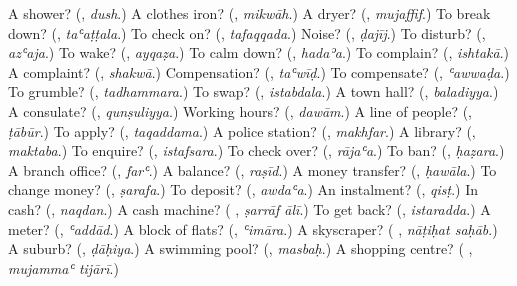 \begin{tcolorbox}[breakable,colback=teal!4,colframe=teal!35!black,title={Before you move on}]
A shower? (\textbf{}, \emph{dush}.) A clothes iron? (\textbf{}, \emph{mikwāh}.) A dryer? (\textbf{}, \emph{mujaffif}.) To break down? (\textbf{}, \emph{taʿaṭṭala}.) To check on? (\textbf{}, \emph{tafaqqada}.) Noise? (\textbf{}, \emph{ḍajīj}.) To disturb? (\textbf{}, \emph{azʿaja}.) To wake? (\textbf{}, \emph{ayqaẓa}.) To calm down? (\textbf{}, \emph{hadaʾa}.) To complain? (\textbf{}, \emph{ishtakā}.) A complaint? (\textbf{}, \emph{shakwā}.) Compensation? (\textbf{}, \emph{taʿwīḍ}.) To compensate? (\textbf{}, \emph{ʿawwaḍa}.) To grumble? (\textbf{}, \emph{tadhammara}.) To swap? (\textbf{}, \emph{istabdala}.) A town hall? (\textbf{}, \emph{baladiyya}.) A consulate? (\textbf{}, \emph{qunṣuliyya}.) Working hours? (\textbf{}, \emph{dawām}.) A line of people? (\textbf{}, \emph{ṭābūr}.) To apply? (\textbf{}, \emph{taqaddama}.) A police station? (\textbf{}, \emph{makhfar}.) A library? (\textbf{}, \emph{maktaba}.) To enquire? (\textbf{}, \emph{istafsara}.) To check over? (\textbf{}, \emph{rājaʿa}.) To ban? (\textbf{}, \emph{ḥaẓara}.) A branch office? (\textbf{}, \emph{farʿ}.) A balance? (\textbf{}, \emph{raṣīd}.) A money transfer? (\textbf{}, \emph{ḥawāla}.) To change money? (\textbf{}, \emph{ṣarafa}.) To deposit? (\textbf{}, \emph{awdaʿa}.) An instalment? (\textbf{}, \emph{qisṭ}.) In cash? (\textbf{}, \emph{naqdan}.) A cash machine? (\textbf{ }, \emph{ṣarrāf ālī}.) To get back? (\textbf{}, \emph{istaradda}.) A meter? (\textbf{}, \emph{ʿaddād}.) A block of flats? (\textbf{}, \emph{ʿimāra}.) A skyscraper? (\textbf{ }, \emph{nāṭiḥat saḥāb}.) A suburb? (\textbf{}, \emph{ḍāḥiya}.) A swimming pool? (\textbf{}, \emph{masbaḥ}.) A shopping centre? (\textbf{ }, \emph{mujammaʿ tijārī}.)
\end{tcolorbox}
